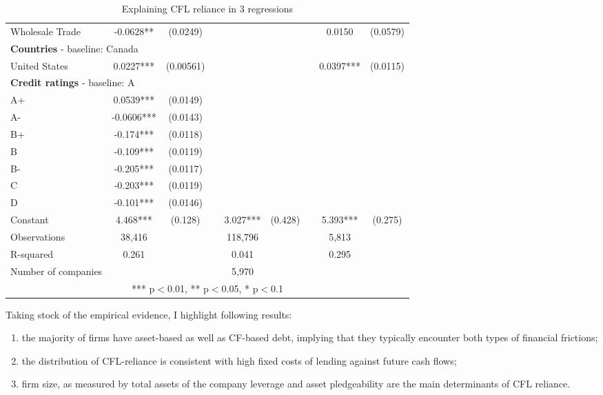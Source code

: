 \documentclass[12pt]{article}
\begin{document}
\begin{table}[H]
{\begin{tabular}{lcccccccc}
Wholesale Trade & -0.0628** & (0.0249) & & & & & 0.0150 & (0.0579) \vspace{2mm} \\
\multicolumn{9}{l}{\textbf{Countries}  - baseline: Canada} \\
United States & 0.0227*** & (0.00561) & & & & & 0.0397*** & (0.0115) \vspace{2mm} \\
 \multicolumn{9}{l}{\textbf{Credit ratings}  - baseline: A} \\
A+ & 0.0539*** & (0.0149) & & & & & & \\
A- & -0.0606*** & (0.0143) & & & & & & \\
B+ & -0.174*** & (0.0118) & & & & & & \\
B & -0.109*** & (0.0119) & & & & & & \\
B- & -0.205*** & (0.0117) & & & & & & \\
C & -0.203*** & (0.0119) & & & & & & \\
D & -0.101*** & (0.0146) & & & & & &  \vspace{2mm} \\
Constant & 4.468*** & (0.128) & & 3.027*** & (0.428) & & 5.393*** & (0.275) \\
\hline
Observations & 38,416 & & & 118,796 & & & 5,813 & \\
R-squared & 0.261 & & & 0.041 & & & 0.295 & \\
Number of companies & & & & 5,970 & & & & \\
\bottomrule
\multicolumn{9}{c}{*** p$<$0.01, ** p$<$0.05, * p$<$0.1} \\
\end{tabular}%
}
\caption{\small Explaining CFL reliance in 3 regressions}
\label{tab:regres}
\end{table}
\restoregeometry %

\noindent Taking stock of the empirical evidence, I highlight following results:
\begin{enumerate}[i]
    \item the majority of firms have asset-based as well as CF-based debt, implying that they typically encounter both types of financial frictions;
    \item the distribution of CFL-reliance is consistent with high fixed costs of lending against future cash flows;
    \item firm size, as measured by total assets of the company leverage and asset pledgeability are the main determinants of CFL reliance.
\end{enumerate}
\end{document}
